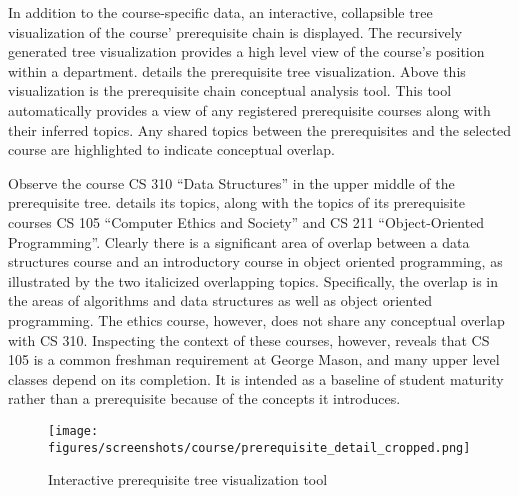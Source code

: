 
In addition to the course-specific data, an interactive, collapsible tree visualization of the course' prerequisite chain is displayed.
The recursively generated tree visualization provides a high level view of the course's position within a department.
 details the prerequisite tree visualization.
Above this visualization is the prerequisite chain conceptual analysis tool.
This tool automatically provides a view of any registered prerequisite courses along with their inferred topics.
Any shared topics between the prerequisites and the selected course are highlighted to indicate conceptual overlap.


Observe the course CS 310 ``Data Structures'' in the upper middle of the prerequisite tree.
 details its topics, along with the topics of its prerequisite courses CS 105 ``Computer Ethics and Society'' and CS 211 ``Object-Oriented Programming''.
Clearly there is a significant area of overlap between a data structures course and an introductory course in object oriented programming, as illustrated by the two italicized overlapping topics.
Specifically, the overlap is in the areas of algorithms and data structures as well as object oriented programming.
The ethics course, however, does not share any conceptual overlap with CS 310.
Inspecting the context of these courses, however, reveals that CS 105 is a common freshman requirement at George Mason, and many upper level classes depend on its completion.
It is intended as a baseline of student maturity rather than a prerequisite because of the concepts it introduces.


\begin{figure*}
  \centering
  \texttt{[image: figures/screenshots/course/prerequisite\_detail\_cropped.png]}
  \caption{Interactive prerequisite tree visualization tool\label{fig:prerequisite-detail}}
\end{figure*}


